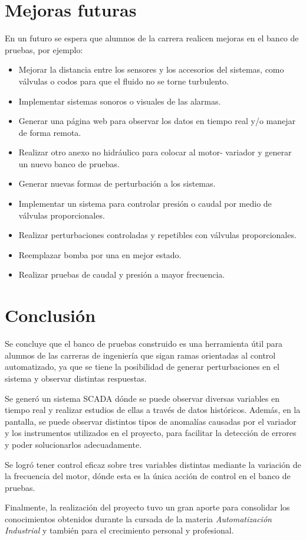 
\newpage
\section{Mejoras futuras}
En un futuro se espera que alumnos de la carrera realicen mejoras en el banco de pruebas, por ejemplo:
\begin{itemize}
	\item Mejorar la distancia entre los sensores y los accesorios del sistemas, como válvulas o codos para que el fluido no se torne turbulento.
	\item Implementar sistemas sonoros o visuales de las alarmas.
	\item Generar una página web para observar los datos en tiempo real y/o manejar de forma remota.
	\item Realizar otro anexo no hidráulico para colocar al motor- variador y generar un nuevo banco de pruebas.
	\item Generar nuevas formas de perturbación a los sistemas.
	\item Implementar un sistema para controlar presión o caudal por medio de válvulas proporcionales.
	\item Realizar perturbaciones controladas y repetibles con válvulas proporcionales.
	\item Reemplazar bomba por una en mejor estado.
	\item Realizar pruebas de caudal y presión a mayor frecuencia.
\end{itemize}

\newpage
\section{Conclusión}
Se concluye que el banco de pruebas construido es una herramienta útil para alumnos de las carreras de ingeniería que sigan ramas orientadas al control automatizado, ya que se tiene la posibilidad de generar perturbaciones en el sistema y observar distintas respuestas.

Se generó un sistema SCADA dónde se puede observar diversas variables en tiempo real y realizar estudios de ellas a través de datos históricos. Además, en la pantalla, se puede observar distintos tipos de anomalías causadas por el variador y los instrumentos utilizados en el proyecto, para facilitar la detección de errores y poder solucionarlos adecuadamente.

Se logró tener control eficaz sobre tres variables distintas mediante la variación de la frecuencia del motor, dónde esta es la única acción de control en el banco de pruebas.

Finalmente, la realización del proyecto tuvo un gran aporte para consolidar los conocimientos obtenidos durante la cursada de la materia \textit{Automatización Industrial} y también para el crecimiento personal y profesional.



\newpage